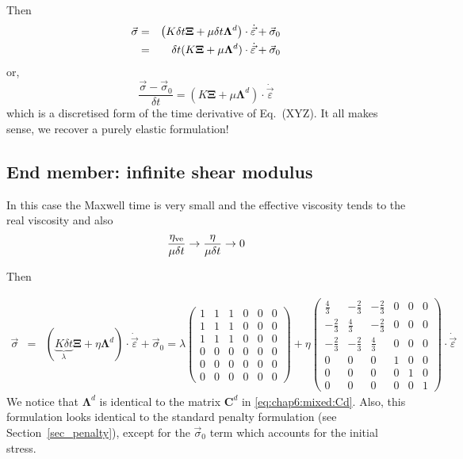 Then
\begin{eqnarray}
\vec{\sigma}
&=&
\left(
K \delta t {\bm \Xi}
+
\mu \delta t {\bm \Lambda}^d
\right)
\cdot
\dot{\vec{\varepsilon}}
+
\vec{\sigma}_0 \nonumber\\
&=& 
\delta t (K  {\bm \Xi}
+ \mu  {\bm \Lambda}^d) \cdot 
\dot{\vec{\varepsilon}}
+
\vec{\sigma}_0 
\end{eqnarray}
or,
\[
\frac{\vec\sigma - \vec\sigma_0}{\delta t}
=(
K  {\bm \Xi}
+ \mu  {\bm \Lambda}^d)
\cdot \dot{\vec{\varepsilon}}
\]
which is a discretised form of the time derivative of Eq.~(XYZ). It all makes sense, we recover a purely 
elastic formulation!


\subsection{End member: infinite shear modulus}
In this case the Maxwell time is very small and the effective
viscosity tends to the real viscosity and also  
\[
\frac{\eta_{\rm ve}}{\mu \delta t} 
\rightarrow 
\frac{\eta}{\mu \delta t} 
\rightarrow 0
\]

Then

\begin{eqnarray}
\vec{\sigma}
&=&
\left(
\underbrace{K \delta t}_{\lambda} {\bm \Xi}
+
\eta {\bm \Lambda}^d
\right)
\cdot
\dot{\vec{\varepsilon}}
+
\vec{\sigma}_0 
= 
\lambda 
\left(
\begin{array}{cccccc}
1 & 1 & 1 & 0 & 0 & 0\\ 
1 & 1 & 1 & 0 & 0 & 0\\ 
1 & 1 & 1 & 0 & 0 & 0\\ 
0 & 0 & 0 & 0 & 0 & 0 \\
0 & 0 & 0 & 0 & 0 & 0 \\
0 & 0 & 0 & 0 & 0 & 0 
\end{array}
\right)
+ 
\eta 
\left(
\begin{array}{cccccc}
\frac43 & - \frac23 & - \frac23 & 0 & 0 & 0 \\
-\frac23 & \frac43 & - \frac23  & 0 & 0 & 0\\
-\frac23& - \frac23 & \frac43  & 0 & 0 & 0\\
0&0&0& 1&0 &0  \\
0&0&0&0&1 &0\\
0&0&0&0&0& 1
\end{array}
\right)
\cdot
\dot{\vec{\varepsilon}}
\end{eqnarray}
We notice that 
${\bm \Lambda}^d$ is identical to the matrix ${\bm C}^d$ in \eqref{eq:chap6:mixed:Cd}.
Also, this formulation looks identical to the standard penalty formulation 
(see Section~\ref{sec_penalty}), except for 
the $\vec{\sigma}_0$ term which accounts for the initial stress.

